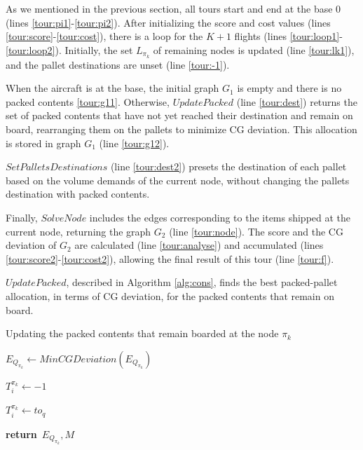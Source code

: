 \documentclass[preprint]{elsarticle}
\renewcommand{\Return}{\State \textbf{return}~}
\begin{document}
As we mentioned in the previous section, all tours start and end at the base $0$\/ (lines \ref{tour:pi1}-\ref{tour:pi2}). After initializing the score and cost values (lines \ref{tour:score}-\ref{tour:cost}), there is a loop for the $K+1$\/ flights (lines \ref{tour:loop1}-\ref{tour:loop2}). Initially, the set $L_{\pi_k}$\/ of remaining nodes is updated (line \ref{tour:lk1}), and the pallet destinations are unset (line \ref{tour:-1}).

When the aircraft is at the base, the initial graph $G_1$\/ is empty and there is no packed contents \ref{tour:g11}. Otherwise, $UpdatePacked$\/ (line \ref{tour:dest}) returns the set of packed contents that have not yet reached their destination and remain on board, rearranging them on the pallets to minimize CG deviation. This allocation is stored in graph $G_1$\/ (line \ref{tour:g12}).

$SetPalletsDestinations$\/ (line \ref{tour:dest2}) presets the destination of each pallet based on the volume demands of the current node, without changing the pallets destination with packed contents.

Finally, $SolveNode$\/ includes the edges corresponding to the items shipped at the current node, returning the graph $G_2$\/ (line \ref{tour:node}). The score and the CG deviation of $G_2$\/ are calculated (line \ref{tour:analyse}) and accumulated (lines \ref{tour:score2}-\ref{tour:cost2}), allowing the final result of this tour (line \ref{tour:f}).


$UpdatePacked$, described in Algorithm \ref{alg:cons}, finds the best packed-pallet allocation, in terms of CG deviation, for the packed contents that remain on board. 


\begin{algorithm}[H]
	\caption{Updating the packed contents that remain boarded at the node $\pi_k$}  \label{alg:cons}
	\begin{algorithmic}[1]
		
		
		\State $E_{Q_{\pi_k}} \gets MinCGDeviation(E_{Q_{\pi_k}})$  \label{cons:minCG}
		
		 \label{cons:Ybegin}
		
		
		\State $T_i^{\pi_k} \gets -1$
		
		\State $T_i^{\pi_k} \gets to_q$   
		\EndIf
		\EndFor		
		\EndFor \label{cons:Yend}
		
		\Return $E_{Q_{\pi_k}}, M$
		
		\EndProcedure
		
	\end{algorithmic}
\end{algorithm}
\end{document}

